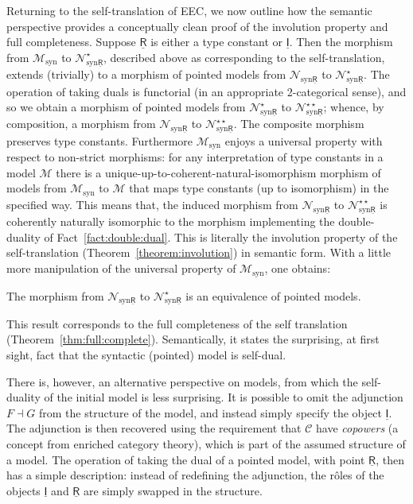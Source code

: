 \documentclass{LMCS}
\newcommand{\comptype}[1]{\underline{#1}}
\newcommand{\CR}{\comptype{\mathsf{R}}}
\newcommand{\CI}{\comptype{\mathsf{I}}}
\begin{document}
Returning to the self-translation of EEC, we now outline how the semantic perspective
provides a conceptually clean proof of the involution property and full completeness.
Suppose $\CR$ is either a type constant or $\CI$. Then the
morphism from $\mathcal{M}_{\mathrm{syn}}$ to $\mathcal{N}_{\mathrm{syn}\CR}^{\star}$,
described above as corresponding to the self-translation, extends (trivially) to a morphism
of pointed models from $\mathcal{N}_{\mathrm{syn}\CR}$ to $\mathcal{N}_{\mathrm{syn}\CR}^{\star}$.
The operation of taking duals is functorial (in an appropriate 2-categorical sense), and so
we obtain a morphism of pointed models from 
$\mathcal{N}_{\mathrm{syn}\CR}^{\star}$ to $\mathcal{N}_{\mathrm{syn}\CR}^{\star\star}$;
whence, by composition, a morphism from 
$\mathcal{N}_{\mathrm{syn}\CR}$ to $\mathcal{N}_{\mathrm{syn}\CR}^{\star\star}$. 
The composite morphism preserves type constants. Furthermore $\mathcal{M}_{\mathrm{syn}}$
enjoys a universal property with respect to non-strict morphisms: 
for any interpretation
of type constants in a model $\mathcal{M}$  there is a 
unique-up-to-coherent-natural-isomorphism 
morphism of models from $\mathcal{M}_{\mathrm{syn}}$ to $\mathcal{M}$
that maps type constants (up to isomorphism) in the specified way. 
This means that, the induced morphism from $\mathcal{N}_{\mathrm{syn}\CR}$ to 
$\mathcal{N}_{\mathrm{syn}\CR}^{\star\star}$ is coherently
naturally isomorphic to the morphism implementing the double-duality of Fact~\ref{fact:double:dual}.
This is literally the involution property of the self-translation (Theorem~\ref{theorem:involution}) in semantic form.
With a little more manipulation of the universal property
of $\mathcal{M}_{\mathrm{syn}}$, one obtains:
\begin{fact}
The morphism 
from $\mathcal{N}_{\mathrm{syn}\CR}$ to $\mathcal{N}_{\mathrm{syn}\CR}^{\star}$ is an equivalence
of pointed models.
\end{fact}

\noindent 
This result corresponds to the full completeness of the self translation
(Theorem~\ref{thm:full:complete}). Semantically, it states the
surprising, at first sight, fact that the syntactic (pointed) model is self-dual.

There is, however,  an alternative perspective on models, from which the
self-duality of the initial model is less surprising. It is possible to omit
the adjunction $F \dashv G$ from the structure of the model, and instead
simply specify the object $\CI$. The adjunction is then recovered using
the requirement that $\mathcal{C}$ have \emph{copowers}
(a concept from  enriched category theory), which is part of the
assumed structure of a model. The operation of taking the dual of a pointed
model, with point $\CR$, then has a simple description: instead of redefining the
adjunction, the r\^{o}les of the objects $\CI$ and $\CR$ are simply swapped in the structure.
\end{document}
